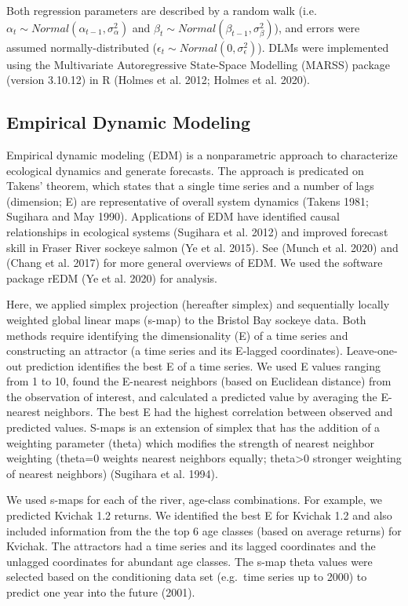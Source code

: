 \documentclass[
]{article}
\begin{document}
Both regression parameters are described by a random walk (i.e.~\(\alpha_t \sim Normal(\alpha_{t-1},\sigma^2_{\alpha})\) and \(\beta_t \sim Normal(\beta_{t-1},\sigma^2_{\beta})\)), and errors were assumed normally-distributed (\(\epsilon_t \sim Normal(0,\sigma^2_{\epsilon})\)). DLMs were implemented using the Multivariate Autoregressive State-Space Modelling (MARSS) package (version 3.10.12) in R (Holmes et al. 2012; Holmes et al. 2020).

\hypertarget{empirical-dynamic-modeling}{%
\subsection*{Empirical Dynamic Modeling}\label{empirical-dynamic-modeling}}

Empirical dynamic modeling (EDM) is a nonparametric approach to characterize ecological dynamics and generate forecasts. The approach is predicated on Takens' theorem, which states that a single time series and a number of lags (dimension; E) are representative of overall system dynamics (Takens 1981; Sugihara and May 1990). Applications of EDM have identified causal relationships in ecological systems (Sugihara et al. 2012) and improved forecast skill in Fraser River sockeye salmon (Ye et al. 2015). See (Munch et al. 2020) and (Chang et al. 2017) for more general overviews of EDM. We used the software package rEDM (Ye et al. 2020) for analysis.

Here, we applied simplex projection (hereafter simplex) and sequentially locally weighted global linear maps (s-map) to the Bristol Bay sockeye data. Both methods require identifying the dimensionality (E) of a time series and constructing an attractor (a time series and its E-lagged coordinates). Leave-one-out prediction identifies the best E of a time series. We used E values ranging from 1 to 10, found the E-nearest neighbors (based on Euclidean distance) from the observation of interest, and calculated a predicted value by averaging the E-nearest neighbors. The best E had the highest correlation between observed and predicted values. S-maps is an extension of simplex that has the addition of a weighting parameter (theta) which modifies the strength of nearest neighbor weighting (theta=0 weights nearest neighbors equally; theta\textgreater0 stronger weighting of nearest neighbors) (Sugihara et al. 1994).

We used s-maps for each of the river, age-class combinations. For example, we predicted Kvichak 1.2 returns. We identified the best E for Kvichak 1.2 and also included information from the the top 6 age classes (based on average returns) for Kvichak. The attractors had a time series and its lagged coordinates and the unlagged coordinates for abundant age classes. The s-map theta values were selected based on the conditioning data set (e.g.~time series up to 2000) to predict one year into the future (2001).
\end{document}
